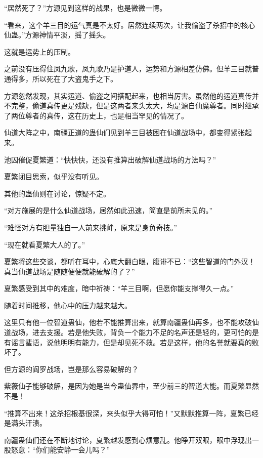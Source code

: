 
\begin{this_body}

“居然死了？”方源见到这样的战果，也是微微一愕。

“看来，这个羊三目的运气真是不太好。居然连续两次，让我偷盗了杀招中的核心仙蛊。”方源神情平淡，摇了摇头。

这就是运势上的压制。

之前没有压得住凤九歌，凤九歌乃是护道人，运势和方源相差仿佛。但羊三目就普通得多，所以死在了大盗鬼手之下。

方源忽然发现，其实运道、偷盗之间搭配起来，也相当厉害。虽然他的运道真传并不完整，偷道真传更是残缺，但是这两者来头太大，均是源自仙魔尊者。同时继承了两位尊者的真传，这在历史上，也是相当罕见的情况了。

仙道大阵之中，南疆正道的蛊仙们见到羊三目被困在仙道战场中，都变得紧张起来。

池囚催促夏繁道：“快快快，还没有推算出破解仙道战场的方法吗？”

夏繁闭目思索，似乎没有听见。

其他的蛊仙则在讨论，惊疑不定。

“对方施展的是什么仙道战场，居然如此迅速，简直是前所未见的。”

“难怪对方有胆量独自一人前来挑衅，原来是身负奇技。”

“现在就看夏繁大人的了。”

夏繁将这些交谈，都听在耳中，心底大翻白眼，腹诽不已：“这些智道的门外汉！真当仙道战场是随随便便就能破解的了？”

夏繁感受到其中的难度，暗中祈祷：“羊三目啊，但愿你能支撑得久一点。”

随着时间推移，他心中的压力越来越大。

这里只有他一位智道蛊仙，他若不能推算出来，就算南疆蛊仙再多，也不能攻破仙道战场，进去支援。若是他失败，背负一个能力不足的名声还是轻的，更可怕的是有谣言蜚语，说他明明有能力，但是却见死不救。若是这样，他的名誉就要真的败坏了。

但方源的阎罗战场，岂是那么容易破解的？

紫薇仙子能够破解，是因为她是当今蛊仙界中，至少前三的智道大能。而夏繁显然不是！

“推算不出来！这杀招根基很深，来头似乎大得可怕！”又默默推算一阵，夏繁已经是满头汗渍。

南疆蛊仙们还在不断地讨论，夏繁越发感到心烦意乱。他睁开双眼，眼中浮现出一股怒意：“你们能安静一会儿吗？”


\end{this_body}

